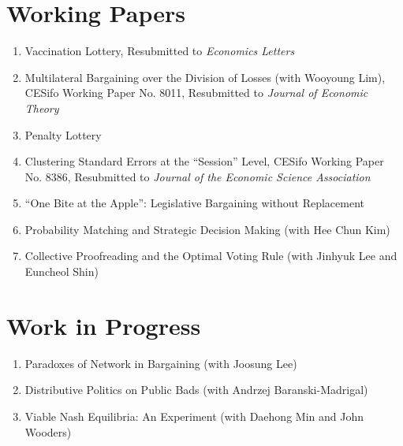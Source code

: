 \documentclass[margin, letterpaper]{res}
\begin{document}
\begin{resume}
\section{Working Papers}
\begin{enumerate}
\item Vaccination Lottery, Resubmitted to \emph{Economics Letters}
\item Multilateral Bargaining over the Division of Losses (with Wooyoung Lim), CESifo Working Paper No. 8011, Resubmitted to \emph{Journal of Economic Theory}
\item Penalty Lottery
\item Clustering Standard Errors at the ``Session'' Level, CESifo Working Paper No. 8386, Resubmitted to \emph{Journal of the Economic Science Association}
\item ``One Bite at the Apple'': Legislative Bargaining without Replacement
\item Probability Matching and Strategic Decision Making (with Hee Chun Kim)
\item Collective Proofreading and the Optimal Voting Rule (with Jinhyuk Lee and Euncheol Shin)
\end{enumerate}

\section{Work in Progress}
\begin{enumerate}
\item Paradoxes of Network in Bargaining (with Joosung Lee)
\item Distributive Politics on Public Bads (with Andrzej Baranski-Madrigal)
\item Viable Nash Equilibria: An Experiment (with Daehong Min and John Wooders)
\end{enumerate}


\end{resume}
\end{document}
